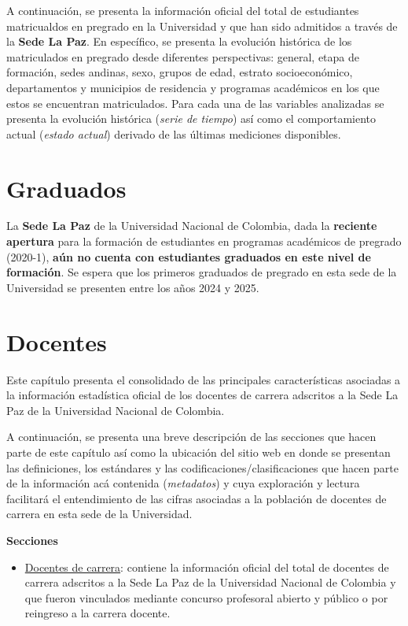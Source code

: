 \documentclass[
]{book}
\providecommand{\tightlist}{%
  \setlength{\itemsep}{0pt}\setlength{\parskip}{0pt}}
\begin{document}
A continuación, se presenta la información oficial del total de estudiantes matricualdos en pregrado en la Universidad y que han sido admitidos a través de la \textbf{Sede La Paz}. En específico, se presenta la evolución histórica de los matriculados en pregrado desde diferentes perspectivas: general, etapa de formación, sedes andinas, sexo, grupos de edad, estrato socioeconómico, departamentos y municipios de residencia y programas académicos en los que estos se encuentran matriculados. Para cada una de las variables analizadas se presenta la evolución histórica (\emph{serie de tiempo}) así como el comportamiento actual (\emph{estado actual}) derivado de las últimas mediciones disponibles.

\hypertarget{Grad}{%
\chapter{Graduados}\label{Grad}}

La \textbf{Sede La Paz} de la Universidad Nacional de Colombia, dada la \textbf{reciente apertura} para la formación de estudiantes en programas académicos de pregrado (2020-1), \textbf{aún no cuenta con estudiantes graduados en este nivel de formación}. Se espera que los primeros graduados de pregrado en esta sede de la Universidad se presenten entre los años 2024 y 2025.

\hypertarget{Doc}{%
\chapter{Docentes}\label{Doc}}

Este capítulo presenta el consolidado de las principales características asociadas a la información estadística oficial de los docentes de carrera adscritos a la Sede La Paz de la Universidad Nacional de Colombia.

A continuación, se presenta una breve descripción de las secciones que hacen parte de este capítulo así como la ubicación del sitio web en donde se presentan las definiciones, los estándares y las codificaciones/clasificaciones que hacen parte de la información acá contenida (\emph{metadatos}) y cuya exploración y lectura facilitará el entendimiento de las cifras asociadas a la población de docentes de carrera en esta sede de la Universidad.

\textbf{Secciones}

\begin{itemize}
\tightlist
\item
  \protect\hyperlink{DocCar}{Docentes de carrera}: contiene la información oficial del total de docentes de carrera adscritos a la Sede La Paz de la Universidad Nacional de Colombia y que fueron vinculados mediante concurso profesoral abierto y público o por reingreso a la carrera docente.
\end{itemize}
\end{document}

